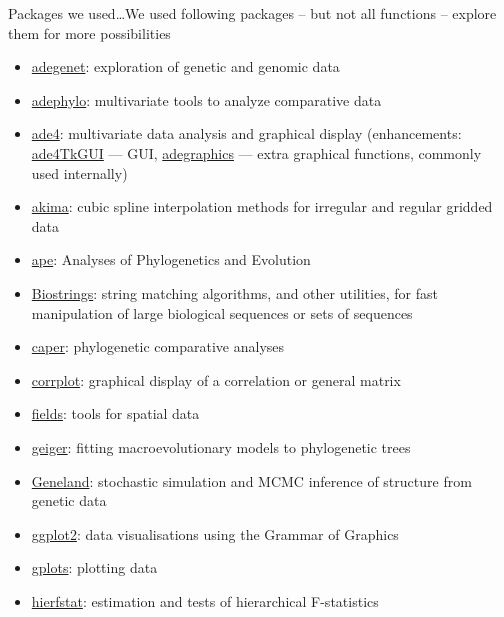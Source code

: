 \documentclass[compress, ucs, xelatex, 11pt, xcolor=svgnames,
  hyperref={
    bookmarks=true,
    unicode=true,
    colorlinks=true,
    pdftitle={Molecular data in R},
    plainpages=false,
    pdfauthor={Vojtech Zeisek},
    pdfsubject={Course about phylogeny and evolution in R},
    pdfcreator={XeLaTeX},
    pdfkeywords={R, evolution, phylogeny, molecular data},
    linkcolor=Tomato,
    anchorcolor=SaddleBrown,
    citecolor=Goldenrod,
    filecolor=DarkMagenta,
    menucolor=Sienna,
    urlcolor=DarkTurquoise,
    pdftex},
  url={hyphens, lowtilde} %
  ]{beamer}
\begin{document}
\begin{frame}[allowframebreaks]{Packages we used\ldots}{We used following packages -- but not all functions -- explore them for more possibilities}
  \begin{itemize}
    \item \href{https://CRAN.R-project.org/package=adegenet}{adegenet}: exploration of genetic and genomic data
    \item \href{https://CRAN.R-project.org/package=adephylo}{adephylo}: multivariate tools to analyze comparative data
    \item \href{https://CRAN.R-project.org/package=ade4}{ade4}: multivariate data analysis and graphical display (enhancements: \href{https://CRAN.R-project.org/package=ade4TkGUI}{ade4TkGUI} --- GUI, \href{https://CRAN.R-project.org/package=adegraphics}{adegraphics} --- extra graphical functions, commonly used internally)
    \item \href{https://CRAN.R-project.org/package=akima}{akima}: cubic spline interpolation methods for irregular and regular gridded data
    \item \href{https://CRAN.R-project.org/package=ape}{ape}: Analyses of Phylogenetics and Evolution
    \item \href{https://www.bioconductor.org/packages/release/bioc/html/Biostrings.html}{Biostrings}: string matching algorithms, and other utilities, for fast manipulation of large biological sequences or sets of sequences
    \item \href{https://CRAN.R-project.org/package=caper}{caper}: phylogenetic comparative analyses
    \item \href{https://CRAN.R-project.org/package=corrplot}{corrplot}: graphical display of a correlation or general matrix
    \item \href{https://CRAN.R-project.org/package=fields}{fields}: tools for spatial data
    \item \href{https://CRAN.R-project.org/package=geiger}{geiger}: fitting macroevolutionary models to phylogenetic trees
    \item \href{https://www2.imm.dtu.dk/~gigu/Geneland/}{Geneland}: stochastic simulation and MCMC inference of structure from genetic data
    \item \href{https://CRAN.R-project.org/package=ggplot2}{ggplot2}: data visualisations using the Grammar of Graphics
    \item \href{https://CRAN.R-project.org/package=gplots}{gplots}: plotting data
    \item \href{https://CRAN.R-project.org/package=hierfstat}{hierfstat}: estimation and tests of hierarchical F-statistics

\end{itemize}
\end{frame}
\end{document}

